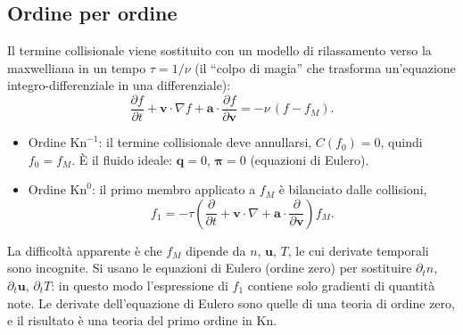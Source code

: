 \subsection{Ordine per ordine}
Il termine collisionale viene sostituito con un modello di rilassamento verso la maxwelliana in un tempo $\tau=1/\nu$ (il ``colpo di magia'' che trasforma un'equazione integro-differenziale in una differenziale):
\begin{equation}
\frac{\partial f}{\partial t}+\mathbf{v}\cdot\nabla f+\mathbf{a}\cdot\frac{\partial f}{\partial\mathbf{v}}=-\nu\,(f-f_M).
\end{equation}
\begin{itemize}
\item Ordine $\mathrm{Kn}^{-1}$: il termine collisionale deve annullarsi, $C(f_0)=0$, quindi $f_0=f_M$. È il fluido ideale: $\mathbf{q}=0$, $\boldsymbol\pi=0$ (equazioni di Eulero).
\item Ordine $\mathrm{Kn}^0$: il primo membro applicato a $f_M$ è bilanciato dalle collisioni,
\begin{equation}
f_1=-\tau\left(\frac{\partial}{\partial t}+\mathbf{v}\cdot\nabla+\mathbf{a}\cdot\frac{\partial}{\partial\mathbf{v}}\right)f_M .
\end{equation}
\end{itemize}
La difficoltà apparente è che $f_M$ dipende da $n$, $\mathbf{u}$, $T$, le cui derivate temporali sono incognite. Si usano le equazioni di Eulero (ordine zero) per sostituire $\partial_tn$, $\partial_t\mathbf{u}$, $\partial_tT$: in questo modo l'espressione di $f_1$ contiene solo gradienti di quantità note. Le derivate dell'equazione di Eulero sono quelle di una teoria di ordine zero, e il risultato è una teoria del primo ordine in $\mathrm{Kn}$.

